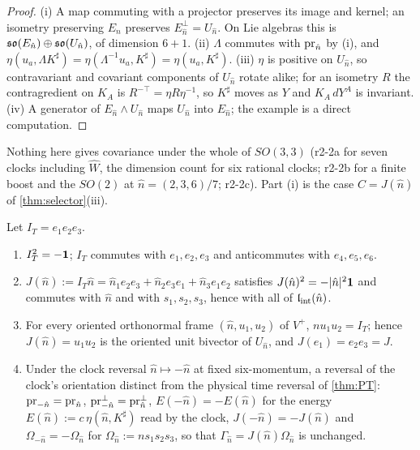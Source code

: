 \begin{proof}
(i) A map commuting with a projector preserves its image and kernel; an isometry preserving $E_{\hat n}$ preserves $E_{\hat n}^\perp=U_{\hat n}$. On Lie algebras this is
$\mathfrak{so}(E_{\hat n})\oplus\mathfrak{so}(U_{\hat n})$, of dimension $6+1$. (ii) $\Lambda$ commutes with $\operatorname{pr}_{\hat n}$ by (i), and $\eta(u_a,\Lambda K^\sharp)=\eta(\Lambda^{-1}u_a,K^\sharp)
=\eta(u_a,K^\sharp)$. (iii) $\eta$ is positive on $U_{\hat n}$, so contravariant and covariant components of $U_{\hat n}$ rotate alike; for an isometry $R$ the
contragredient on $K_A$ is $R^{-\top}=\eta R\eta^{-1}$, so $K^\sharp$ moves as $Y$ and $K_A\,dY^A$ is invariant. (iv) A generator of $E_{\hat n}\wedge U_{\hat n}$
maps $U_{\hat n}$ into $E_{\hat n}$; the example is a direct computation.
\end{proof}

Nothing here gives covariance under the whole
of $SO(3,3)$ (r2-2a for seven clocks including $\widehat W$, the dimension count for six rational clocks; r2-2b for a finite boost and the $SO(2)$ at
$\hat n=(2,3,6)/7$; r2-2c). Part (i) is the case $C=J(\hat n)$ of \cref{thm:selector}(iii).

\begin{proposition}
\label{r2:prop:J}
Let $I_T=e_1e_2e_3$.
\begin{enumerate}[label=(\roman*),leftmargin=2.2em]
\item $I_T^2=-\mathbf 1$; $I_T$ commutes with $e_1,e_2,e_3$ and anticommutes with $e_4,e_5,e_6$.
\item $J(\hat n):=I_T\hat n=\hat n_1e_2e_3+\hat n_2e_3e_1+\hat n_3e_1e_2$ satisfies $J(\hat n)^2=-|\hat n|^2\mathbf 1$ and commutes with $\hat n$ and with $s_1,s_2,s_3$, hence with all of $\mathfrak l_{\rm int}(\hat n)$.
\item For every oriented orthonormal frame $(\hat n,u_1,u_2)$ of $V^+$, $nu_1u_2=I_T$; hence $J(\hat n)=u_1u_2$ is the oriented unit bivector of $U_{\hat n}$, and
$J(e_1)=e_2e_3=J$.
\item Under the clock reversal $\hat n\mapsto-\hat n$ at fixed six-momentum, a reversal of the clock's orientation distinct from the physical
time reversal of \cref{thm:PT}: $\operatorname{pr}_{-\hat n}=\operatorname{pr}_{\hat n}$, $\operatorname{pr}^{\perp}_{-\hat n}=\operatorname{pr}^{\perp}_{\hat n}$, $E(-\hat n)=-E(\hat n)$ for the energy
$E(\hat n):=c\,\eta(\hat n,K^\sharp)$ read by the clock, $J(-\hat n)=-J(\hat n)$ and
$\Omega_{-\hat n}=-\Omega_{\hat n}$ for $\Omega_{\hat n}:=ns_1s_2s_3$, so that $\Gamma_{\hat n}=J(\hat n)\Omega_{\hat n}$ is unchanged.
\end{enumerate}
\end{proposition}

